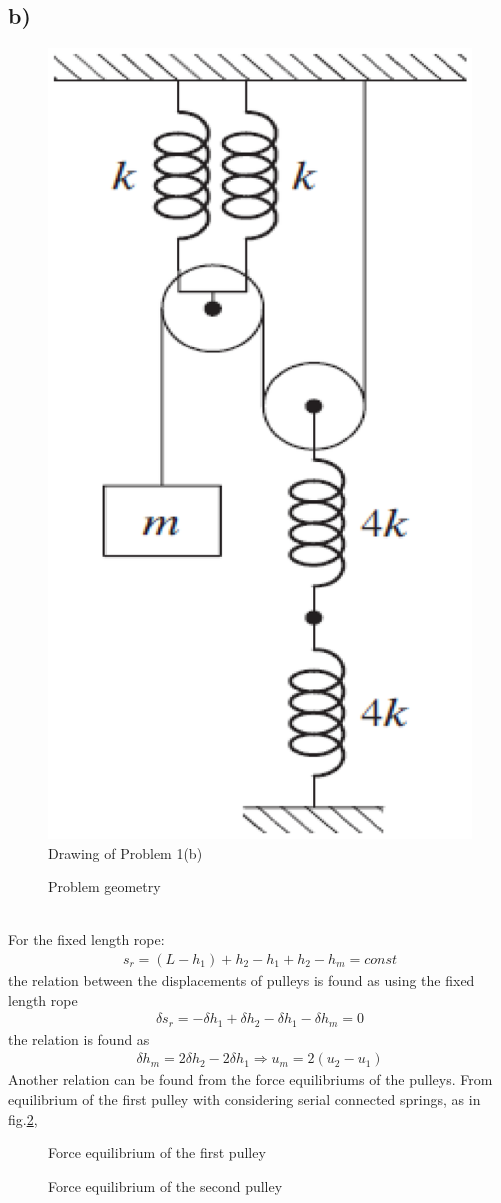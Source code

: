 \documentclass[]{report}
\begin{document}
\subsection*{b)}
\begin{figure}[ht!]
\centering
\includegraphics[height=0.60\textwidth]{./problem1b}
\caption[Drawing of  Problem 1(b)]{Drawing of Problem 1(b)}
\label{fig:problem1b}
\end{figure}
\begin{figure}[ht!]
\centering
\def\svgwidth{0.8\textwidth}

\caption{Problem geometry}
\end{figure}
~\\
For the fixed length rope:
\begin{eqnarray*}
s_r=\left(L-h_1\right)+h_2-h_1+h_2-h_m=const
\end{eqnarray*}
the relation between the displacements of pulleys is found as using the fixed length rope
\begin{eqnarray*}
\delta s_r =-\delta h_1+\delta h_2-\delta h_1 -\delta h_m=0
\end{eqnarray*}
the relation is found as
\begin{eqnarray*}
\delta h_m =2\delta h_2 -2 \delta h_1\Rightarrow u_m=2\left( u_2- u_1\right)
\end{eqnarray*}
Another relation can be found from the force equilibriums of the pulleys.
From equilibrium of the first pulley with considering serial connected springs, as in fig.\ref{fig:problem1b-2},
\begin{figure}[ht!]
\centering
\def\svgwidth{0.5\textwidth}

\caption{Force equilibrium of the first pulley}
\label{fig:problem1b-2}
\end{figure}
\begin{figure}[ht!]
\centering
\def\svgwidth{0.5\textwidth}

\caption{Force equilibrium of the second pulley}
\label{fig:problem1b-3}
\end{figure}
\end{document}
